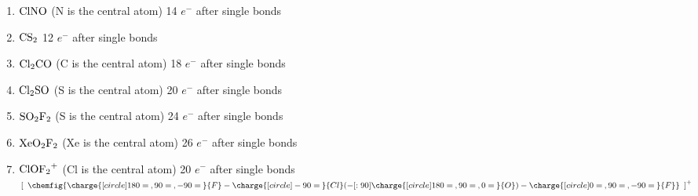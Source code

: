 \documentclass[11pt]{article}
\begin{document}
\begin{enumerate}

\item $\ce{ClNO}$ (N is the central atom)  14 $e^-$ after single bonds \\[2ex]

\item $\ce{CS2}$ 12  $e^-$ after single bonds \\[2ex]

\item $\ce{Cl2CO}$ (C is the central atom) 18  $e^-$ after single bonds \\[2ex]

\item $\ce{Cl2SO}$ (S is the central atom) 20  $e^-$ after single bonds \\[2ex]

\item $\ce{SO2F2}$ (S is the central atom) 24  $e^-$ after single bonds \\[2ex]

\item $\ce{XeO2F2}$ (Xe is the central atom) 26 $e^-$ after single bonds \\[2ex]

\item $\ce{ClOF2^+}$ (Cl is the central atom) 20 $e^-$ after single bonds \\[2ex]

$\left[\enspace
\chemfig{
    \charge{[circle]180=\:,90=\:,-90=\:}{F}
    - \charge{[circle]-90=\:}{Cl}
      (-[:90] \charge{[circle]180=\:,90=\:,0=\:}{O})
    - \charge{[circle]0=\:,90=\:,-90=\:}{F}
}
\enspace\right]^+$
\end{enumerate}
\end{document}
